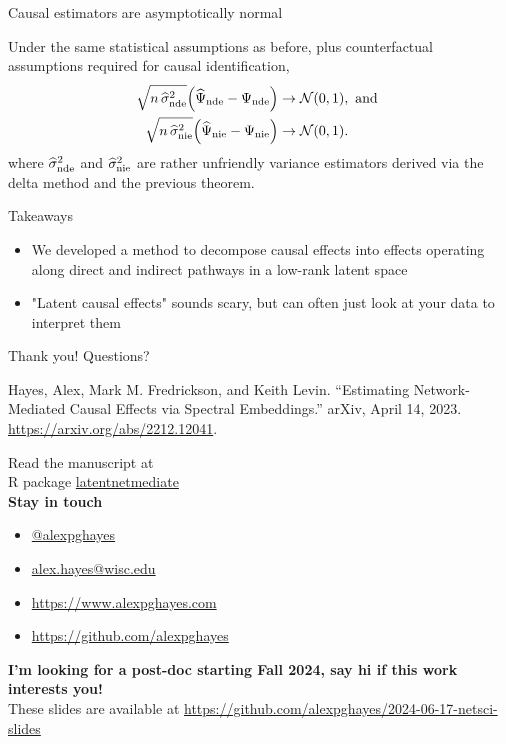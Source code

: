 \documentclass[aspectratio=169]{beamer}
\theoremstyle{remark}
\begin{document}
\begin{frame}{Causal estimators are asymptotically normal}
    \vspace{2mm}
    \begin{theorem}
        Under the same statistical assumptions as before, plus counterfactual assumptions required for causal identification,
        \begin{align*}
            \sqrt{n \, \sigmahatnde} \paren*{\ndehat - \nde}
             & \to
            \Normal{0}{1}, \text { and } \\
            \sqrt{n \, \sigmahatnie} \paren*{\niehat - \nie}
             & \to
            \Normal{0}{1}.
        \end{align*}
        \noindent where $\widehat{\sigma}^2_\mathrm{nde}$ and $\widehat{\sigma}^2_\mathrm{nie}$ are rather unfriendly variance estimators derived via the delta method and the previous theorem.
    \end{theorem}
\end{frame}

\begin{frame}{Takeaways}
    \begin{itemize}
        \item We developed a method to decompose causal effects into effects operating along direct and indirect pathways in a low-rank latent space
        \item "Latent causal effects" sounds scary, but can often just look at your data to interpret them
    \end{itemize}
\end{frame}

\begin{frame}{Thank you! Questions?}

    Hayes, Alex, Mark M. Fredrickson, and Keith Levin. “Estimating Network-Mediated Causal Effects via Spectral Embeddings.” arXiv, April 14, 2023. \url{https://arxiv.org/abs/2212.12041}.

    Read the manuscript at  \\
    R package \href{https://github.com/alexpghayes/latentnetmediate}{latentnetmediate} \\
    \textbf{Stay in touch} \\
    \begin{itemize}
        \item[]  \href{https://twitter.com/alexpghayes}{@alexpghayes}
        \item[]  \href{mailto:alex.hayes@wisc.edu}{alex.hayes@wisc.edu}
        \item[]  \url{https://www.alexpghayes.com}
        \item[]  \url{https://github.com/alexpghayes}
    \end{itemize}
    \textbf{I'm looking for a post-doc starting Fall 2024, say hi if this work interests you!} \\
    These slides are available at \url{https://github.com/alexpghayes/2024-06-17-netsci-slides}
\end{frame}
\end{document}
